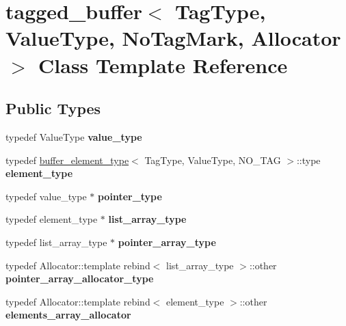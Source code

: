 \hypertarget{classtagged__buffer}{}\section{tagged\+\_\+buffer$<$ Tag\+Type, Value\+Type, No\+Tag\+Mark, Allocator $>$ Class Template Reference}
\label{classtagged__buffer}
\subsection*{Public Types}
\begin{DoxyCompactItemize}
\item 
\hypertarget{classtagged__buffer_a8f2435fdbb7412caa3cd15fb7b789377}{}typedef Value\+Type {\bfseries value\+\_\+type}\label{classtagged__buffer_a8f2435fdbb7412caa3cd15fb7b789377}

\item 
\hypertarget{classtagged__buffer_ae6b260026727498ea7c0ba7920bb8822}{}typedef \hyperlink{structbuffer__element__type}{buffer\+\_\+element\+\_\+type}$<$ Tag\+Type, Value\+Type, N\+O\+\_\+\+T\+A\+G $>$\+::type {\bfseries element\+\_\+type}\label{classtagged__buffer_ae6b260026727498ea7c0ba7920bb8822}

\item 
\hypertarget{classtagged__buffer_aa4162491f43454450838d013ae951a03}{}typedef value\+\_\+type $\ast$ {\bfseries pointer\+\_\+type}\label{classtagged__buffer_aa4162491f43454450838d013ae951a03}

\item 
\hypertarget{classtagged__buffer_a39d93a4d3a30ee57fddd40376f34ab43}{}typedef element\+\_\+type $\ast$ {\bfseries list\+\_\+array\+\_\+type}\label{classtagged__buffer_a39d93a4d3a30ee57fddd40376f34ab43}

\item 
\hypertarget{classtagged__buffer_af1f4bc0015c78e5f1dae218baac21fec}{}typedef list\+\_\+array\+\_\+type $\ast$ {\bfseries pointer\+\_\+array\+\_\+type}\label{classtagged__buffer_af1f4bc0015c78e5f1dae218baac21fec}

\item 
\hypertarget{classtagged__buffer_a1acafe4225c2f7a32719d886de7ef5f1}{}typedef Allocator\+::template rebind$<$ list\+\_\+array\+\_\+type $>$\+::other {\bfseries pointer\+\_\+array\+\_\+allocator\+\_\+type}\label{classtagged__buffer_a1acafe4225c2f7a32719d886de7ef5f1}

\item 
\hypertarget{classtagged__buffer_a81e8080bd7d068966374eb0bc45b8d7d}{}typedef Allocator\+::template rebind$<$ element\+\_\+type $>$\+::other {\bfseries elements\+\_\+array\+\_\+allocator}\label{classtagged__buffer_a81e8080bd7d068966374eb0bc45b8d7d}

\end{DoxyCompactItemize}
